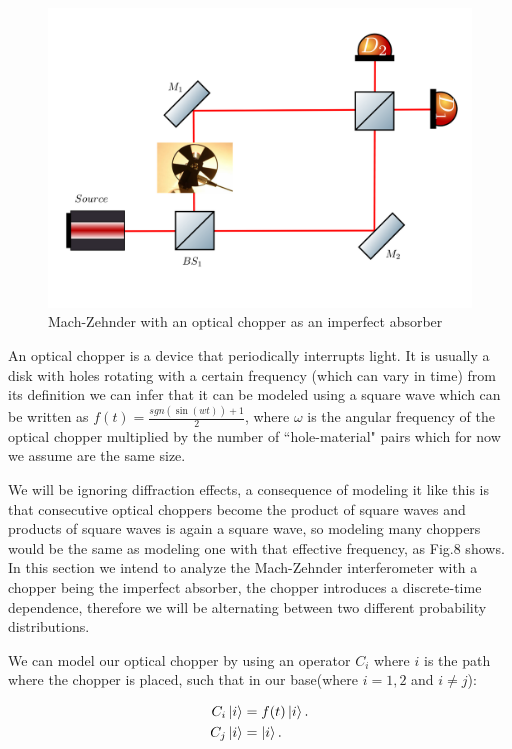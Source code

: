 \documentclass[12pt]{article}
\begin{document}
 \begin{figure}[h!]
\centering
\includegraphics[width=\linewidth]{images/machzenhderchopper.png}
\caption{Mach-Zehnder with an optical chopper as an imperfect absorber}
\label{fig:BS2}
\end{figure}
An optical chopper is a device that periodically interrupts light. It is usually a disk with holes rotating with a certain frequency (which can vary in time) from its definition we can infer that it can be modeled using a square wave which can be written as  $f(t)=\frac{sgn(\sin(wt))+1}{2}$, where $\omega$ is the angular frequency of the optical chopper multiplied by the number of ``hole-material" pairs which for now we assume are the same size. 
  
We will be ignoring diffraction effects, a consequence of modeling it like this is that consecutive optical choppers become the product of square waves and products of square waves is again a square wave, so modeling many choppers would be the same as modeling one with that effective frequency, as Fig.8 shows. In this section we intend to analyze the Mach-Zehnder interferometer with a chopper being the imperfect absorber, the chopper introduces a discrete-time dependence, therefore we will be alternating between two different probability distributions.


We can model our optical chopper by using an operator $C_{i}$ where $i$ is the path where the chopper is placed, such that in our base(where $i=1,2$ and $i \neq j$):

\begin{align}
C_{i}\ket{i}&=f(t)\ket{i}.\\
C_{j}\ket{i}&=\ket{i}.
\end{align}
\end{document}
